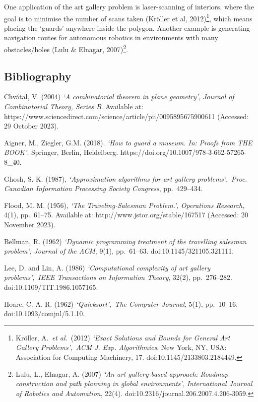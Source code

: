 \documentclass[
]{article}
\begin{document}
One application of the art gallery problem is laser-scanning of
interiors, where the goal is to minimise the number of scans taken
(Kröller et al, 2012)\footnote{Kröller, A.~\emph{et al.}~(2012)
  \emph{`Exact Solutions and Bounds for General Art Gallery
  Problems'},~\emph{ACM J. Exp. Algorithmics}. New York, NY, USA:
  Association for Computing Machinery, 17. doi:10.1145/2133803.2184449.},
which means placing the `guards' anywhere inside the polygon. Another
example is generating navigation routes for autonomous robotics in
environments with many obstacles/holes (Lulu \& Elnagar,
2007)\footnote{Lulu, L., Elnagar, A. (2007) \emph{`An art gallery-based
  approach: Roadmap construction and path planning in global
  environments'}, \emph{International Journal of Robotics and
  Automation}, 22(4). doi:10.2316/journal.206.2007.4.206-3059.}.

\newpage

\subsection{Bibliography}\label{bibliography}

Chvátal, V. (2004) \emph{`A combinatorial theorem in plane geometry'},
\emph{Journal of Combinatorial Theory, Series B}. Available at:
https://www.sciencedirect.com/science/article/pii/0095895675900611
(Accessed: 29 October 2023).

Aigner, M., Ziegler, G.M. (2018). \emph{`How to guard a museum. In:
Proofs from THE BOOK'}. Springer, Berlin, Heidelberg.
https://doi.org/10.1007/978-3-662-57265-8\_40.

Ghosh, S. K. (1987), \emph{`Approximation algorithms for art gallery
problems'},~\emph{Proc. Canadian Information Processing Society
Congress}, pp.~429--434.

Flood, M. M. (1956), \emph{`The Traveling-Salesman Problem.',}
\emph{Operations Research}, 4(1), pp.~61--75. Available at:
http://www.jstor.org/stable/167517 (Accessed: 20 November 2023).

Bellman, R. (1962) \emph{`Dynamic programming treatment of the
travelling salesman problem'}, \emph{Journal of the ACM}, 9(1),
pp.~61--63. doi:10.1145/321105.321111.

Lee, D. and Lin, A. (1986) \emph{`Computational complexity of art
gallery problems'},~\emph{IEEE Transactions on Information Theory},
32(2), pp.~276--282. doi:10.1109/TIT.1986.1057165.

Hoare, C. A. R. (1962) \emph{`Quicksort'},~\emph{The Computer Journal},
5(1), pp.~10--16. doi:10.1093/comjnl/5.1.10.
\end{document}
